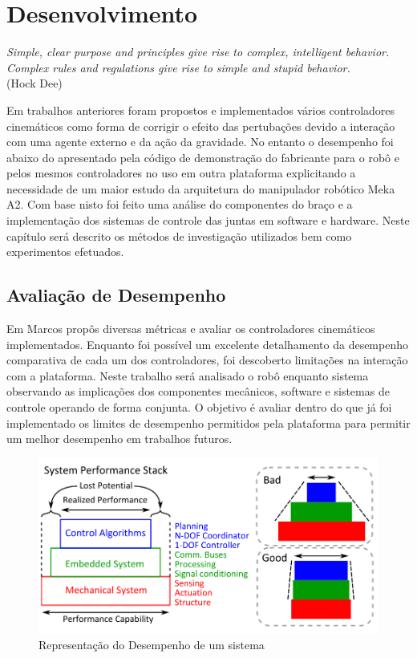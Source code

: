 \chapter{Desenvolvimento\label{ch:develop}}

\begin{flushright}
\textit{Simple, clear purpose and principles give rise to complex, intelligent behavior. Complex rules and regulations give rise to simple and stupid behavior.}\\(Hock Dee)
\end{flushright}

Em trabalhos anteriores foram propostos e implementados vários controladores cinemáticos como forma de corrigir o efeito das pertubações devido a interação com uma agente externo e da ação da gravidade. No entanto o desempenho foi abaixo do apresentado pela código de demonstração do fabricante para o robô e pelos mesmos controladores no uso em outra plataforma explicitando a necessidade de um maior estudo da arquitetura do manipulador robótico Meka A2. Com base nisto foi feito uma análise do componentes do braço e a implementação dos sistemas de controle das juntas em software e hardware. Neste capítulo será descrito os métodos de investigação utilizados bem como experimentos efetuados.

\section{Avaliação de Desempenho}

Em \cite{nocite} Marcos propôs diversas métricas e avaliar os controladores cinemáticos implementados. Enquanto foi possível um excelente detalhamento da desempenho comparativa de cada um dos controladores, foi descoberto limitações na interação com a plataforma. Neste trabalho será analisado o robô enquanto sistema observando as implicações dos componentes mecânicos, software e sistemas de controle operando de forma conjunta. O objetivo é avaliar dentro do que já foi implementado os limites de desempenho permitidos pela plataforma para permitir um melhor desempenho em trabalhos futuros. 

\begin{figure}[H]
    \centering
    \includegraphics[width = 0.9\linewidth]{tex/figs/system_perfomance.png}
    \caption{Representação do Desempenho de um sistema \cite{paine2014high}}
    \label{fig:system_perfomance}
\end{figure}

